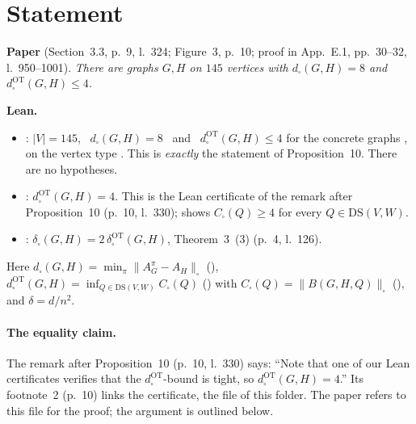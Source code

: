

\paperversion

\section{Statement}
\textbf{Paper} (Section~3.3, p.~9, l.~324; Figure~3, p.~10; proof in App.~E.1, pp.~30--32, l.~950--1001).
\emph{There are graphs $G,H$ on $145$ vertices with $d_\square(G,H)=8$ and $d^{\mathrm{OT}}_\square(G,H)\le4$.}

\textbf{Lean.}
\begin{itemize}
\item {}: \quad $|V| = 145$, \ $d_\square(G,H) = 8$ \ and \ $d^{\mathrm{OT}}_\square(G,H) \le 4$
for the concrete graphs ,  on the vertex type . This is \emph{exactly} the statement of
Proposition~10. There are no hypotheses.
\item {}: \quad $d^{\mathrm{OT}}_\square(G,H)=4$. This is the Lean certificate of the
remark after Proposition~10 (p.~10, l.~330);  shows $C_\square(Q)\ge4$ for every
$Q\in\mathrm{DS}(V,W)$.
\item {}: \quad $\delta_\square(G,H)=2\,\delta^{\mathrm{OT}}_\square(G,H)$, Theorem~3~(3)
(p.~4, l.~126).
\end{itemize}
Here $d_\square(G,H)=\min_\pi\|A^\pi_G-A_H\|_\square$ (), $d^{\mathrm{OT}}_\square(G,H)=\inf_{Q\in\mathrm{DS}(V,W)}C_\square(Q)$
() with $C_\square(Q)=\|B(G,H,Q)\|_\square$ (), and $\delta=d/n^2$.

\paragraph{The equality claim.} The remark after Proposition~10 (p.~10, l.~330) says: ``Note that one of our Lean
certificates verifies that the $d^{\mathrm{OT}}_\square$-bound is tight, so $d^{\mathrm{OT}}_\square(G,H)=4$.'' Its
footnote~2 (p.~10) links the certificate, the file  of
this folder. The paper refers to this file for the proof; the argument is outlined below.

